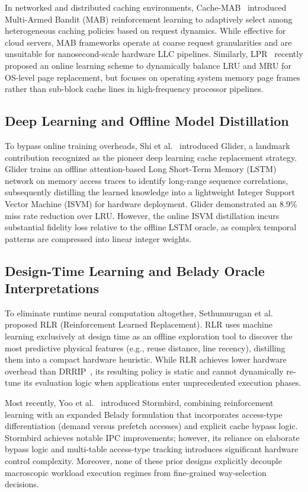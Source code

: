 \documentclass[conference]{IEEEtran}
\begin{document}
In networked and distributed caching environments, Cache-MAB~\cite{cachemab2023} introduced Multi-Armed Bandit (MAB) reinforcement learning to adaptively select among heterogeneous caching policies based on request dynamics. While effective for cloud servers, MAB frameworks operate at coarse request granularities and are unsuitable for nanosecond-scale hardware LLC pipelines. Similarly, LPR~\cite{lpr2025} recently proposed an online learning scheme to dynamically balance LRU and MRU for OS-level page replacement, but focuses on operating system memory page frames rather than sub-block cache lines in high-frequency processor pipelines.

\subsection{Deep Learning and Offline Model Distillation}
To bypass online training overheads, Shi et al.~\cite{shi2019glider} introduced Glider, a landmark contribution recognized as the pioneer deep learning cache replacement strategy. Glider trains an offline attention-based Long Short-Term Memory (LSTM) network on memory access traces to identify long-range sequence correlations, subsequently distilling the learned knowledge into a lightweight Integer Support Vector Machine (ISVM) for hardware deployment. Glider demonstrated an 8.9\% miss rate reduction over LRU. However, the online ISVM distillation incurs substantial fidelity loss relative to the offline LSTM oracle, as complex temporal patterns are compressed into linear integer weights.

\subsection{Design-Time Learning and Belady Oracle Interpretations}
To eliminate runtime neural computation altogether, Sethumurugan et al.~\cite{sethumurugan2021rlr} proposed RLR (Reinforcement Learned Replacement). RLR uses machine learning exclusively at design time as an offline exploration tool to discover the most predictive physical features (e.g., reuse distance, line recency), distilling them into a compact hardware heuristic. While RLR achieves lower hardware overhead than DRRIP~\cite{jaleel2010high}, its resulting policy is static and cannot dynamically re-tune its evaluation logic when applications enter unprecedented execution phases.

Most recently, Yoo et al.~\cite{yoo2023stormbird} introduced Stormbird, combining reinforcement learning with an expanded Belady formulation that incorporates access-type differentiation (demand versus prefetch accesses) and explicit cache bypass logic. Stormbird achieves notable IPC improvements; however, its reliance on elaborate bypass logic and multi-table access-type tracking introduces significant hardware control complexity. Moreover, none of these prior designs explicitly decouple macroscopic workload execution regimes from fine-grained way-selection decisions.
\end{document}
